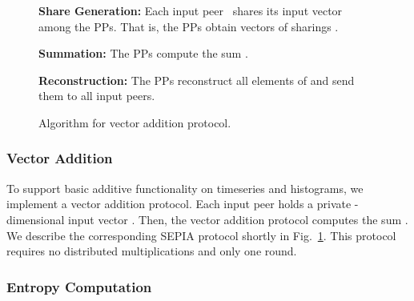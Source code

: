 \documentclass[letterpaper,11pt,onecolumn,titlepage]{article}
\begin{document}
\begin{figure}[t]
	\begin{boxedminipage}{1\textwidth}
	\begin{small}
	\begin{compactenum}
		\item \textbf{Share Generation:} Each input peer~ shares its input vector  among the PPs. That is, the PPs obtain  vectors of sharings .
		\item \textbf{Summation:} The PPs compute the sum .
		\item \textbf{Reconstruction:} The PPs reconstruct all elements of  and send them to all input peers.
	\end{compactenum}
	\end{small}
	\end{boxedminipage}
	\caption{Algorithm for vector addition protocol.}
	\label{box:addition}
\end{figure}


\subsubsection{Vector Addition}
\label{sec:addition}

To support basic additive functionality on timeseries and histograms, we implement a vector addition protocol.
Each input peer  holds a private -dimensional input vector . 
Then, the vector addition protocol computes the sum . We describe the 
corresponding SEPIA protocol shortly in Fig.~\ref{box:addition}. 
This protocol requires no distributed multiplications and only one round.

\subsubsection{Entropy Computation}
\label{sec:entropy}
\end{document}
